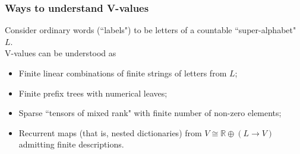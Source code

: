 \documentclass{beamer}
\newcommand{\msmagenta}[1]{{\color{mymagenta} #1}}
\begin{document}
\begin{frame}

  \frametitle{\msmagenta{Ways to understand V-values}}

Consider ordinary words (``labels") to be letters of a countable ``super-alphabet" $L$.\\[2ex]

V-values can be understood as

\begin{itemize}

  \item Finite linear combinations of finite strings of letters from $L$;
  \item Finite prefix trees with numerical leaves;
  \item Sparse ``tensors of mixed rank" with finite number of non-zero elements;
  \item Recurrent maps (that is, nested dictionaries) from $V \cong \mathbb{R}\oplus (L \rightarrow V)$  admitting finite descriptions.

\end{itemize}

\end{frame}
\end{document}

